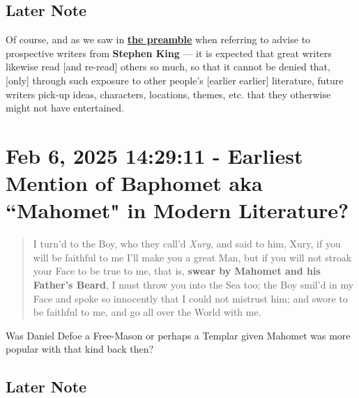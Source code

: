 \documentclass[a4paper]{article}
\begin{document}
\subsection{Later Note}

Of course, and as we saw in \textbf{\hyperref[SECINTRO]{the preamble}} when referring to advise \cite{King2000} to prospective writers from \textbf{Stephen King} --- it is expected that great writers likewise read [and re-read] others so much, so that it cannot be denied that, [only] through such exposure to other people's [earlier earlier] literature, future writers pick-up ideas, characters, locations, themes, etc. that they otherwise might not have entertained.




\section{Feb 6, 2025 14:29:11 - Earliest Mention of Baphomet aka ``Mahomet" in Modern Literature?}
\label{SEC9}


\noindent
\begin{minipage}{1\textwidth}
\vspace{1em}
\begin{quotation}
{\ttfamily


I turn’d to the Boy, who they call’d \textit{Xury}, and said to him, Xury, if you will be faithful to me I’ll make you a great Man, but if you will not stroak your Face to be true to me, that is, \textbf{swear by Mahomet and his Father’s Beard}, I must throw you into the Sea too; the Boy smil’d in my Face and spoke so innocently that I could not mistrust him; and swore to be faithful to me, and go all over the World with me.


}
\end{quotation}
\vspace{1em}
\end{minipage}


Was Daniel Defoe a Free-Mason or perhaps a Templar given Mahomet was more popular with that kind back then? 

\subsection{Later Note}
\end{document}
